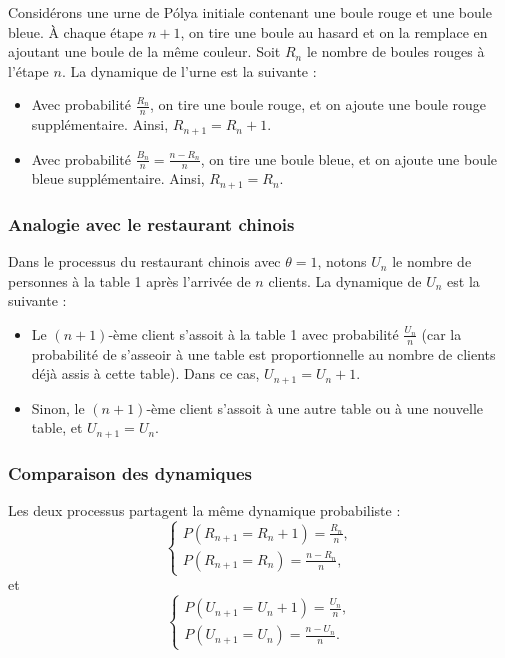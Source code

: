 \documentclass[12pt, a4paper]{article}
\theoremstyle{definition}
\theoremstyle{plain}
\begin{document}
Considérons une urne de Pólya initiale contenant une boule rouge et une boule bleue. À chaque étape $n+1$, on tire une boule au hasard et on la remplace en ajoutant une boule de la même couleur. Soit $R_n$ le nombre de boules rouges à l'étape $n$. La dynamique de l'urne est la suivante : 

\begin{itemize}
    \item Avec probabilité $\frac{R_n}{n}$, on tire une boule rouge, et on ajoute une boule rouge supplémentaire. Ainsi, $R_{n+1} = R_n + 1$.
    \item Avec probabilité $\frac{B_n}{n} = \frac{n - R_n}{n}$, on tire une boule bleue, et on ajoute une boule bleue supplémentaire. Ainsi, $R_{n+1} = R_n$.
\end{itemize}

\subsubsection{Analogie avec le restaurant chinois}

Dans le processus du restaurant chinois avec $\theta = 1$, notons $U_n$ le nombre de personnes à la table 1 après l'arrivée de $n$ clients. La dynamique de $U_n$ est la suivante :

\begin{itemize}
    \item Le $(n+1)$-ème client s'assoit à la table 1 avec probabilité $\frac{U_n}{n}$ (car la probabilité de s'asseoir à une table est proportionnelle au nombre de clients déjà assis à cette table). Dans ce cas, $U_{n+1} = U_n + 1$.
    \item Sinon, le $(n+1)$-ème client s'assoit à une autre table ou à une nouvelle table, et $U_{n+1} = U_n$.
\end{itemize}

\subsubsection{Comparaison des dynamiques}

Les deux processus partagent la même dynamique probabiliste :
\[
\begin{cases}
P(R_{n+1} = R_n + 1) = \frac{R_n}{n}, \\
P(R_{n+1} = R_n) = \frac{n - R_n}{n},
\end{cases}
\]
et
\[
\begin{cases}
P(U_{n+1} = U_n + 1) = \frac{U_n}{n}, \\
P(U_{n+1} = U_n) = \frac{n - U_n}{n}.
\end{cases}
\]
\end{document}
